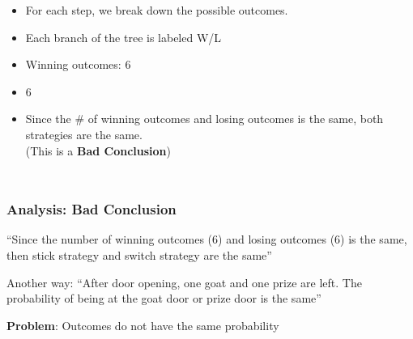 \documentclass{beamer}
\begin{document}
\begin{frame}
{\begin{columns}
    
      \begin{itemize}
      \item For each step, we break down the possible outcomes.
      \item Each branch of the tree is labeled W/L
        \bigskip
        
      \item \alert{Winning outcomes:} 6
      \item {} 6
        \bigskip

      \item<2> Since the \# of winning outcomes and losing outcomes
        is the same, \alert{both strategies are the same.}\\ \hfill
        (This is a {\bf Bad Conclusion})
      \end{itemize}
    \end{columns}
  }
\end{frame}

\begin{frame}
  \frametitle{Analysis: Bad Conclusion}

  {\large

    ``Since the number of winning outcomes (6) and losing outcomes (6)
    is the same, then stick strategy and switch strategy are the
    same''

    \bigskip

    \alert{Another way:} ``After door opening, one goat and one prize
    are left. The probability of being at the goat door or prize door
    is the same''

    \bigskip

    \alert{{\bf Problem}: Outcomes do not have the same probability}
  }
\end{frame}
\end{document}
